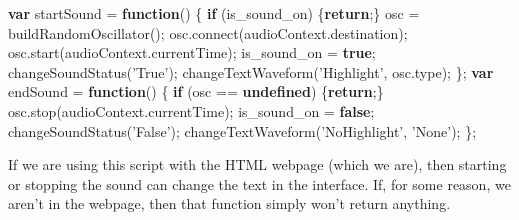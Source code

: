 \documentclass[]{article}
\newenvironment{Shaded}{}{}
\newcommand{\KeywordTok}[1]{\textcolor[rgb]{0.00,0.44,0.13}{\textbf{#1}}}
\newcommand{\StringTok}[1]{\textcolor[rgb]{0.25,0.44,0.63}{#1}}
\newcommand{\VariableTok}[1]{\textcolor[rgb]{0.10,0.09,0.49}{#1}}
\newcommand{\ControlFlowTok}[1]{\textcolor[rgb]{0.00,0.44,0.13}{\textbf{#1}}}
\newcommand{\OperatorTok}[1]{\textcolor[rgb]{0.40,0.40,0.40}{#1}}
\newcommand{\AttributeTok}[1]{\textcolor[rgb]{0.49,0.56,0.16}{#1}}
\newcommand{\NormalTok}[1]{#1}
\begin{document}
\begin{Shaded}
\begin{Highlighting}[]
\KeywordTok{var}\NormalTok{ startSound }\OperatorTok{=} \KeywordTok{function}\NormalTok{() }\OperatorTok{\{}
    \ControlFlowTok{if}\NormalTok{ (is_sound_on) }\OperatorTok{\{}\ControlFlowTok{return}\OperatorTok{;\}}
\NormalTok{    osc }\OperatorTok{=} \AttributeTok{buildRandomOscillator}\NormalTok{()}\OperatorTok{;}
    \VariableTok{osc}\NormalTok{.}\AttributeTok{connect}\NormalTok{(}\VariableTok{audioContext}\NormalTok{.}\AttributeTok{destination}\NormalTok{)}\OperatorTok{;}
    \VariableTok{osc}\NormalTok{.}\AttributeTok{start}\NormalTok{(}\VariableTok{audioContext}\NormalTok{.}\AttributeTok{currentTime}\NormalTok{)}\OperatorTok{;}
\NormalTok{    is_sound_on }\OperatorTok{=} \KeywordTok{true}\OperatorTok{;}
    \AttributeTok{changeSoundStatus}\NormalTok{(}\StringTok{'True'}\NormalTok{)}\OperatorTok{;}
    \AttributeTok{changeTextWaveform}\NormalTok{(}\StringTok{'Highlight'}\OperatorTok{,} \VariableTok{osc}\NormalTok{.}\AttributeTok{type}\NormalTok{)}\OperatorTok{;}
\OperatorTok{\};}
\KeywordTok{var}\NormalTok{ endSound }\OperatorTok{=} \KeywordTok{function}\NormalTok{() }\OperatorTok{\{}
    \ControlFlowTok{if}\NormalTok{ (osc }\OperatorTok{==} \KeywordTok{undefined}\NormalTok{) }\OperatorTok{\{}\ControlFlowTok{return}\OperatorTok{;\}}
    \VariableTok{osc}\NormalTok{.}\AttributeTok{stop}\NormalTok{(}\VariableTok{audioContext}\NormalTok{.}\AttributeTok{currentTime}\NormalTok{)}\OperatorTok{;}
\NormalTok{    is_sound_on }\OperatorTok{=} \KeywordTok{false}\OperatorTok{;}
    \AttributeTok{changeSoundStatus}\NormalTok{(}\StringTok{'False'}\NormalTok{)}\OperatorTok{;}
    \AttributeTok{changeTextWaveform}\NormalTok{(}\StringTok{'NoHighlight'}\OperatorTok{,} \StringTok{'None'}\NormalTok{)}\OperatorTok{;}
\OperatorTok{\};}
\end{Highlighting}
\end{Shaded}

If we are using this script with the HTML webpage (which we are), then
starting or stopping the sound can change the text in the interface. If,
for some reason, we aren't in the webpage, then that function simply
won't return anything.
\end{document}
